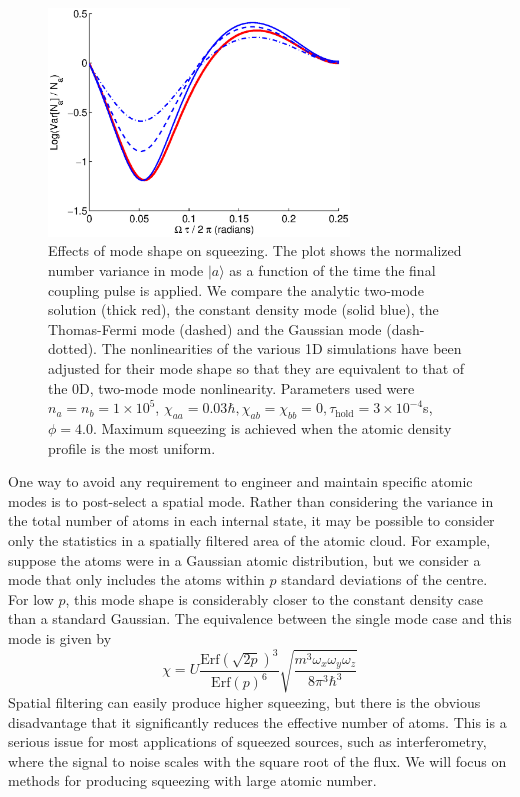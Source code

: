 \documentclass{iopart}
\begin{document}
\begin{figure}
    \centering
    \includegraphics[width=8cm]{figures/modal_squeezing_effects_1D.eps}
    \caption{Effects of mode shape on squeezing. The plot shows the normalized number variance in mode $|a \rangle$ as a function of the time the final coupling pulse is applied. We compare the analytic two-mode solution (thick red), the constant density mode (solid blue), the Thomas-Fermi mode (dashed) and the Gaussian mode (dash-dotted). The nonlinearities of the various 1D simulations have been adjusted for their mode shape so that they are equivalent to that of the 0D, two-mode mode nonlinearity. Parameters used were $n_a = n_b =1 \times 10^5$, $\chi_{aa}=0.03 \hbar, \chi_{ab}=\chi_{bb}=0, \tau_{\mathrm{hold}}=3\times 10^{-4}$s, $\phi=4.0$. Maximum squeezing is achieved when the atomic density profile is the most uniform.}
    \label{figModalSqueezingEffects1D}
\end{figure}

One way to avoid any requirement to engineer and maintain specific atomic modes is to post-select a spatial mode.  Rather than considering the variance in the total number of atoms in each internal state, it may be possible to consider only the statistics in a spatially filtered area of the atomic cloud.  For example, suppose the atoms were in a Gaussian atomic distribution, but we consider a mode that only includes the atoms within $p$ standard deviations of the centre. For low $p$, this mode shape is considerably closer to the constant density case than a standard Gaussian. The equivalence between the single mode case and this mode is given by
\begin{equation}
\chi = U \frac{{\mathrm{Erf}} (\sqrt{2p})^3}{{\mathrm{Erf}}(p)^6} \sqrt{\frac{m^3 \omega_x \omega_y \omega_z}{8 \pi^3 \hbar^3}}
\end{equation}
Spatial filtering can easily produce higher squeezing, but there is the obvious disadvantage that it  significantly reduces the effective number of atoms.  This is a serious issue for most applications of squeezed sources, such as interferometry, where the signal to noise scales with the square root of the flux.  We will focus on methods for producing squeezing with large atomic number.
\end{document}
